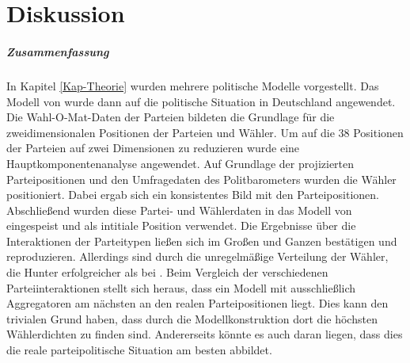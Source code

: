 
\chapter{Diskussion}\label{Kap-Diskussion}

\paragraph{Zusammenfassung}
In Kapitel \ref{Kap-Theorie} wurden mehrere politische Modelle vorgestellt. Das Modell von \citet{laver2005policy} wurde dann auf die politische Situation in Deutschland angewendet. Die Wahl-O-Mat-Daten der Parteien bildeten die Grundlage für die zweidimensionalen Positionen der Parteien und Wähler. Um auf die 38 Positionen der Parteien auf zwei Dimensionen zu reduzieren wurde eine Hauptkomponentenanalyse angewendet. Auf Grundlage der projizierten Parteipositionen und den Umfragedaten des Politbarometers wurden die Wähler positioniert. Dabei ergab sich ein konsistentes Bild mit den Parteipositionen. Abschließend wurden diese Partei- und Wählerdaten in das Modell von \citet{laver2005policy} eingespeist und als intitiale Position verwendet. Die Ergebnisse über die Interaktionen der Parteitypen ließen sich im Großen und Ganzen bestätigen und reproduzieren. Allerdings sind durch die unregelmäßige Verteilung der Wähler, die Hunter erfolgreicher als bei \citet{laver2005policy}. Beim Vergleich der verschiedenen Parteiinteraktionen stellt sich heraus, dass ein Modell mit ausschließlich Aggregatoren am nächsten an den realen Parteipositionen liegt. Dies kann den trivialen Grund haben, dass durch die Modellkonstruktion dort die höchsten Wählerdichten zu finden sind. Andererseits könnte es auch daran liegen, dass dies die reale parteipolitische Situation am besten abbildet.

